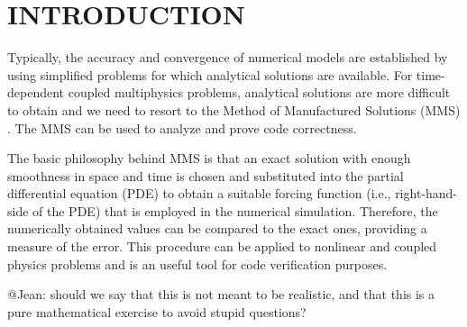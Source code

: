 \section*{INTRODUCTION}
Typically, the accuracy and convergence of numerical models are established by using simplified problems for which analytical solutions are available.  For time-dependent coupled multiphysics problems, analytical solutions are more difficult to obtain and we need to resort to the Method of Manufactured Solutions (MMS) \cite{roache2002}.  The MMS can be used to analyze and prove code correctness.

The basic philosophy behind MMS is that an exact solution with enough smoothness in space and time is chosen and substituted into the partial differential equation (PDE) to obtain a suitable forcing function (i.e., right-hand-side of the PDE) that is employed in the numerical simulation.  Therefore, the numerically obtained values can be compared to the exact ones, providing a measure of the error.  This procedure can be applied to nonlinear and coupled physics problems and is an useful tool for code verification purposes.

@Jean:  should we say that this is not meant to be realistic, and that this is a pure mathematical exercise to avoid stupid questions?
